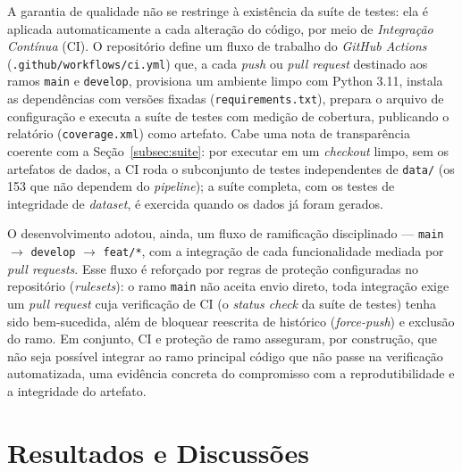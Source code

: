 \documentclass[
      12pt,
      a4paper,
      openright,
      oneside,
      chapter=TITLE,
      section=TITLE,
      english,
      french,
      spanish,
      brazilian
    ]{abntex2}
\begin{document}
    A garantia de qualidade não se restringe à existência da suíte de testes: ela é
    aplicada automaticamente a cada alteração do código, por meio de \textit{Integração
    Contínua} (CI). O repositório define um fluxo de trabalho do \textit{GitHub Actions}
    (\texttt{.github/workflows/ci.yml}) que, a cada \textit{push} ou \textit{pull
    request} destinado aos ramos \texttt{main} e \texttt{develop}, provisiona um
    ambiente limpo com Python 3.11, instala as dependências com versões fixadas
    (\texttt{requirements.txt}), prepara o arquivo de configuração e executa a suíte de
    testes com medição de cobertura, publicando o relatório (\texttt{coverage.xml}) como
    artefato. Cabe uma nota de transparência coerente com a Seção~\ref{subsec:suite}: por
    executar em um \textit{checkout} limpo, sem os artefatos de dados, a CI roda o
    subconjunto de testes independentes de \texttt{data/} (os 153 que não dependem do
    \textit{pipeline}); a suíte completa, com os testes de integridade de \textit{dataset},
    é exercida quando os dados já foram gerados.

    O desenvolvimento adotou, ainda, um fluxo de ramificação disciplinado ---
    \texttt{main} $\rightarrow$ \texttt{develop} $\rightarrow$ \texttt{feat/*}, com a
    integração de cada funcionalidade mediada por \textit{pull requests}. Esse fluxo é
    reforçado por regras de proteção configuradas no repositório (\textit{rulesets}): o
    ramo \texttt{main} não aceita envio direto, toda integração exige um \textit{pull
    request} cuja verificação de CI (o \textit{status check} da suíte de testes) tenha
    sido bem-sucedida, além de bloquear reescrita de histórico (\textit{force-push})
    e exclusão do ramo. Em conjunto, CI e proteção de ramo asseguram, por construção, que
    não seja possível integrar ao ramo principal código que não passe na verificação
    automatizada, uma evidência concreta do compromisso com a reprodutibilidade e a
    integridade do artefato.

    \chapter{Resultados e Discussões}
    \label{cap:resultados}
    
    
\end{document}
